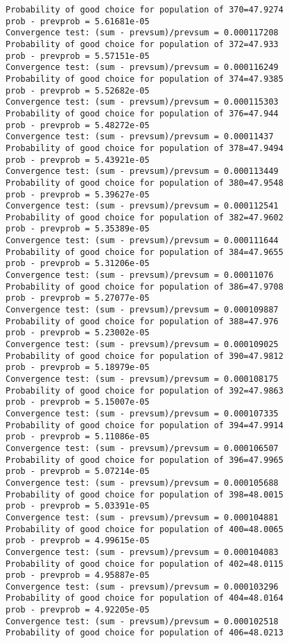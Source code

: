 \documentclass[11pt,onecolumn]{article}
\begin{document}
\begin{verbatim}
Probability of good choice for population of 370=47.9274
prob - prevprob = 5.61681e-05
Convergence test: (sum - prevsum)/prevsum = 0.000117208
Probability of good choice for population of 372=47.933
prob - prevprob = 5.57151e-05
Convergence test: (sum - prevsum)/prevsum = 0.000116249
Probability of good choice for population of 374=47.9385
prob - prevprob = 5.52682e-05
Convergence test: (sum - prevsum)/prevsum = 0.000115303
Probability of good choice for population of 376=47.944
prob - prevprob = 5.48272e-05
Convergence test: (sum - prevsum)/prevsum = 0.00011437
Probability of good choice for population of 378=47.9494
prob - prevprob = 5.43921e-05
Convergence test: (sum - prevsum)/prevsum = 0.000113449
Probability of good choice for population of 380=47.9548
prob - prevprob = 5.39627e-05
Convergence test: (sum - prevsum)/prevsum = 0.000112541
Probability of good choice for population of 382=47.9602
prob - prevprob = 5.35389e-05
Convergence test: (sum - prevsum)/prevsum = 0.000111644
Probability of good choice for population of 384=47.9655
prob - prevprob = 5.31206e-05
Convergence test: (sum - prevsum)/prevsum = 0.00011076
Probability of good choice for population of 386=47.9708
prob - prevprob = 5.27077e-05
Convergence test: (sum - prevsum)/prevsum = 0.000109887
Probability of good choice for population of 388=47.976
prob - prevprob = 5.23002e-05
Convergence test: (sum - prevsum)/prevsum = 0.000109025
Probability of good choice for population of 390=47.9812
prob - prevprob = 5.18979e-05
Convergence test: (sum - prevsum)/prevsum = 0.000108175
Probability of good choice for population of 392=47.9863
prob - prevprob = 5.15007e-05
Convergence test: (sum - prevsum)/prevsum = 0.000107335
Probability of good choice for population of 394=47.9914
prob - prevprob = 5.11086e-05
Convergence test: (sum - prevsum)/prevsum = 0.000106507
Probability of good choice for population of 396=47.9965
prob - prevprob = 5.07214e-05
Convergence test: (sum - prevsum)/prevsum = 0.000105688
Probability of good choice for population of 398=48.0015
prob - prevprob = 5.03391e-05
Convergence test: (sum - prevsum)/prevsum = 0.000104881
Probability of good choice for population of 400=48.0065
prob - prevprob = 4.99615e-05
Convergence test: (sum - prevsum)/prevsum = 0.000104083
Probability of good choice for population of 402=48.0115
prob - prevprob = 4.95887e-05
Convergence test: (sum - prevsum)/prevsum = 0.000103296
Probability of good choice for population of 404=48.0164
prob - prevprob = 4.92205e-05
Convergence test: (sum - prevsum)/prevsum = 0.000102518
Probability of good choice for population of 406=48.0213

\end{verbatim}
\end{document}
